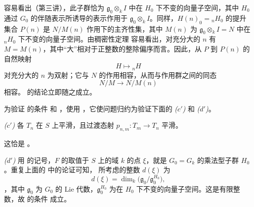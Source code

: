 容易看出（第三讲），此子群恰为 \(\mathfrak g_0\otimes_kI\) 中在 \(H_0\) 下不变的向量子空间，其中 \(H_0\) 通过 \(G_0\) 的伴随表示所诱导的表示作用于 \(\mathfrak g_0\otimes_kI\)。同样，\(H(n)_0={}_nH_0\) 的提升集合 \(P(n)\) 是 \(N/M(n)\) 作用下的主齐性集，其中 \(M(n)\) 为 \(\mathfrak g_0\otimes_kI=N\) 中在 \({}_nH_0\) 下不变的向量子空间。由稠密性定理  容易看出，对充分大的 \(n\) 有 \(M=M(n)\)，其中“大”相对于正整数的整除偏序而言。因此，从 \(P\) 到 \(P(n)\) 的自然映射 \[
  H\longmapsto{}_nH
\] 对充分大的 \(n\) 为双射；它与 \(N\) 的作用相容，从而与作用群之间的同态 \[
  N/M\longrightarrow N/M(n)
\] 相容。 的结论立即随之成立。

为验证  的条件 \textit{} 和 \textit{}，使用 ，它使问题归约为验证下面的 \textit{(\(c'\))} 和 \textit{(\(d'\))}。

\smallskip\noindent{}\textit{(\(c'\))} 各 \(T_n\) 在 \(S\) 上平滑，且过渡态射 \(p_{n,m}\colon T_m\to T_n\) 平滑。

这恰是 。

\smallskip\noindent{}\textit{(\(d'\))} 用  的记号，\(F\) 的取值于 \(S\) 上的域 \(k\) 的点 \(\xi\)，就是 \(G_0=G_k\) 的乘法型子群 \(H_0\)。重复上面的  中的论证可知， 所考虑的整数 \(d(\xi)\) 为  \[
  d(\xi)=\dim_k\bigl(\mathfrak g_0/\mathfrak g_0^{H_0}\bigr),
\]，其中 \(\mathfrak g_0\) 为 \(G_0\) 的 Lie 代数，\(\mathfrak g_0^{H_0}\) 为在 \(H_0\) 下不变的向量子空间。这是有限整数，故  的条件  成立。

